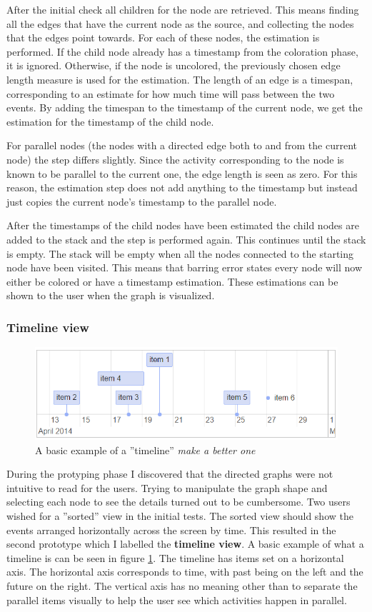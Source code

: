 \documentclass[english,12pt,a4paper,pdftex,sci,utf8]{aaltothesis}
\theoremstyle{definition}
\newcommand{\nyi}[1]{\noindent\colorbox{nyibg}{\textcolor{nyitext}{\emph{#1}}}}
\begin{document}
After the initial check all children for the node are retrieved.
This means finding all the edges that have the current node as the source, and collecting the nodes that the edges point towards.
For each of these nodes, the estimation is performed.
If the child node already has a timestamp from the coloration phase, it is ignored.
Otherwise, if the node is uncolored, the previously chosen edge length measure is used for the estimation. 
The length of an edge is a timespan, corresponding to an estimate for how much time will pass between the two events.
By adding the timespan to the timestamp of the current node, we get the estimation for the timestamp of the child node.

For parallel nodes (the nodes with a directed edge both to and from the current node) the step differs slightly. 
Since the activity corresponding to the node is known to be parallel to the current one, the edge length is seen as zero.
For this reason, the estimation step does not add anything to the timestamp but instead just copies the current node's timestamp to the parallel node.

After the timestamps of the child nodes have been estimated the child nodes are added to the stack and the step is performed again.
This continues until the stack is empty.
The stack will be empty when all the nodes connected to the starting node have been visited.
This means that barring error states every node will now either be colored or have a timestamp estimation.
These estimations can be shown to the user when the graph is visualized.



\subsubsection{Timeline view}

\begin{figure}[htb]
    \centering \includegraphics[width=0.6\linewidth]{gfx/basictimeline.png}
    \caption{A basic example of a ''timeline'' \nyi{make a better one}}
    \label{fig:basictimeline}
\end{figure}

During the protyping phase I discovered that the directed graphs were not intuitive to read for the users.
Trying to manipulate the graph shape and selecting each node to see the details turned out to be cumbersome.
Two users wished for a ''sorted'' view in the initial tests.
The sorted view should show the events arranged horizontally across the screen by time.
This resulted in the second prototype which I labelled the \textbf{timeline view}.
A basic example of what a timeline is can be seen in figure \ref{fig:basictimeline}.
The timeline has items set on a horizontal axis.
The horizontal axis corresponds to time, with past being on the left and the future on the right.
The vertical axis has no meaning other than to separate the parallel items visually to help the user see which activities happen in parallel.
\end{document}
